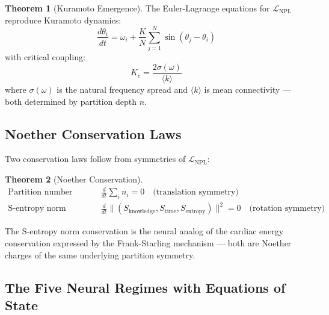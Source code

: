 \documentclass[12pt,a4paper]{article}
\theoremstyle{definition}
\newtheorem{theorem}{Theorem}
\newcommand{\SE}{S_{\text{entropy}}}
\newcommand{\SK}{S_{\text{knowledge}}}
\newcommand{\ST}{S_{\text{time}}}
\newcommand{\LNPL}{\mathcal{L}_{\text{NPL}}}
\begin{document}
\begin{theorem}[Kuramoto Emergence]
The Euler-Lagrange equations for $\LNPL$ reproduce Kuramoto dynamics:
\begin{equation}
\frac{d\theta_i}{dt} = \omega_i + \frac{K}{N}\sum_{j=1}^N \sin(\theta_j - \theta_i)
\end{equation}
with critical coupling:
\begin{equation}
K_c = \frac{2\sigma(\omega)}{\langle k \rangle}
\end{equation}
where $\sigma(\omega)$ is the natural frequency spread and $\langle k \rangle$ is
mean connectivity — both determined by partition depth $n$.
\end{theorem}

\subsection{Noether Conservation Laws}

Two conservation laws follow from symmetries of $\LNPL$:

\begin{theorem}[Noether Conservation]
\begin{align}
\text{Partition number conservation:} &\quad \frac{d}{dt}\sum_i n_i = 0 \quad \text{(translation symmetry)}\\
\text{S-entropy norm conservation:} &\quad \frac{d}{dt}\|(\SK, \ST, \SE)\|^2 = 0 \quad \text{(rotation symmetry)}
\end{align}
\end{theorem}

The S-entropy norm conservation is the neural analog of the cardiac
energy conservation expressed by the Frank-Starling mechanism —
both are Noether charges of the same underlying partition symmetry.

\subsection{The Five Neural Regimes with Equations of State}
\end{document}
